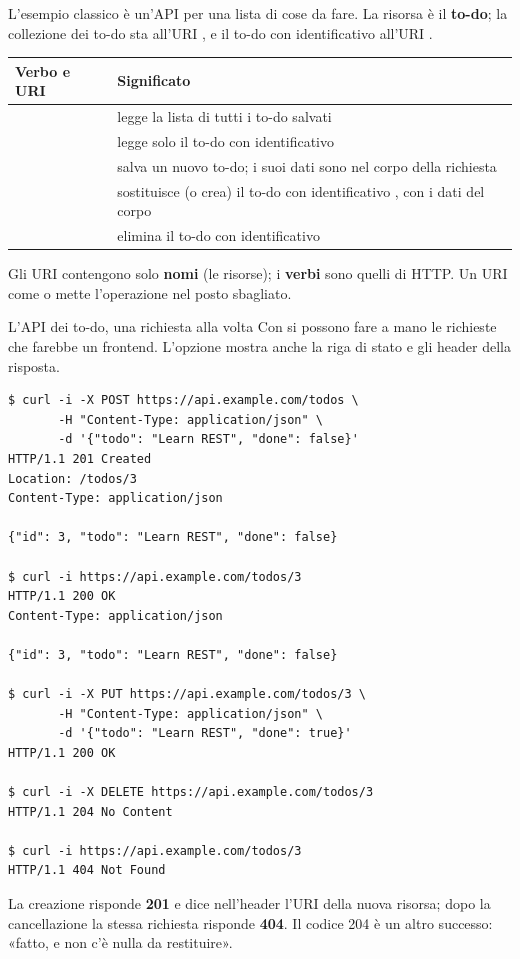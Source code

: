 L'esempio classico è un'API per una lista di cose da fare. La risorsa è il \textbf{to-do}; la collezione dei to-do sta
all'URI , e il to-do con identificativo  all'URI .

\begin{center}
\renewcommand{\arraystretch}{1.25}
\begin{tabular}{lP{10.6cm}}
\toprule
\textbf{Verbo e URI} & \textbf{Significato} \\
\midrule
{}          & legge la lista di tutti i to-do salvati \\
     & legge solo il to-do con identificativo  \\
         & salva un nuovo to-do; i suoi dati sono nel corpo della richiesta \\
     & sostituisce (o crea) il to-do con identificativo , con i dati del corpo \\
  & elimina il to-do con identificativo  \\
\bottomrule
\end{tabular}
\end{center}

Gli URI contengono solo \textbf{nomi} (le risorse); i \textbf{verbi} sono quelli di HTTP. Un URI come 
o  mette l'operazione nel posto sbagliato.

\begin{esempio}{L'API dei to-do, una richiesta alla volta}
Con  si possono fare a mano le richieste che farebbe un frontend. L'opzione  mostra anche la riga di
stato e gli header della risposta.
\begin{lstlisting}[style=shell, name=Terminale]
$ curl -i -X POST https://api.example.com/todos \
       -H "Content-Type: application/json" \
       -d '{"todo": "Learn REST", "done": false}'
HTTP/1.1 201 Created
Location: /todos/3
Content-Type: application/json

{"id": 3, "todo": "Learn REST", "done": false}

$ curl -i https://api.example.com/todos/3
HTTP/1.1 200 OK
Content-Type: application/json

{"id": 3, "todo": "Learn REST", "done": false}

$ curl -i -X PUT https://api.example.com/todos/3 \
       -H "Content-Type: application/json" \
       -d '{"todo": "Learn REST", "done": true}'
HTTP/1.1 200 OK

$ curl -i -X DELETE https://api.example.com/todos/3
HTTP/1.1 204 No Content

$ curl -i https://api.example.com/todos/3
HTTP/1.1 404 Not Found
\end{lstlisting}
La creazione risponde \textbf{201} e dice nell'header  l'URI della nuova risorsa; dopo la cancellazione
la stessa richiesta \code{GET} risponde \textbf{404}. Il codice 204 è un altro successo: «fatto, e non c'è nulla da
restituire».
\end{esempio}

